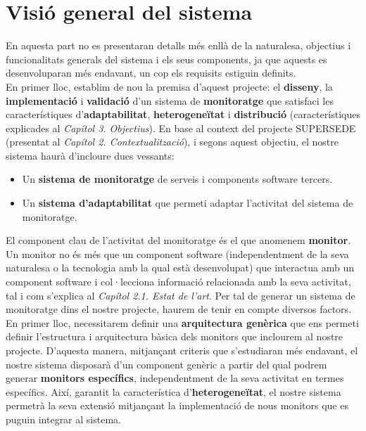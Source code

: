 
\chapter{Visió general del sistema} %

\label{AnalisiRequisits} %

En aquesta part no es presentaran detalls més enllà de la naturalesa, objectius i funcionalitats generals del sistema i els seus components, ja que aquests es desenvoluparan més endavant, un cop els requisits estiguin definits.\\

En primer lloc, establim de nou la premisa d'aquest projecte: el \textbf{disseny}, la \textbf{implementació} i \textbf{validació} d'un sistema de \textbf{monitoratge} que satisfaci les característiques d'\textbf{adaptabilitat}, \textbf{heterogeneïtat} i \textbf{distribució} (característiques explicades al \textit{Capítol 3. Objectius}). En base al context del projecte SUPERSEDE (presentat al \textit{Capítol 2. Contextualització}), i segons aquest objectiu, el nostre sistema haurà d'incloure dues vessants:

\begin{itemize}
\item Un \textbf{sistema de monitoratge} de serveis i components software tercers.
\item Un \textbf{sistema d'adaptabilitat} que permeti adaptar l'activitat del sistema de monitoratge.
\end{itemize}

El component clau de l'activitat del monitoratge és el que anomenem \textbf{monitor}. Un monitor no és més que un component software (independentment de la seva naturalesa o la tecnologia amb la qual està desenvolupat) que interactua amb un component software i col·lecciona informació relacionada amb la seva activitat, tal i com s'explica al \textit{Capítol 2.1. Estat de l'art}. Per tal de generar un sistema de monitoratge dins el nostre projecte, haurem de tenir en compte diversos factors.\\

En primer lloc, necessitarem definir una \textbf{arquitectura genèrica} que ens permeti definir l'estructura i arquitectura bàsica dels monitors que inclourem al nostre projecte. D'aquesta manera, mitjançant criteris que s'estudiaran més endavant, el nostre sistema disposarà d'un component genèric a partir del qual podrem generar \textbf{monitors específics}, independentment de la seva activitat en termes específics. Així, garantit la característica d'\textbf{heterogeneïtat}, el nostre sistema permetrà la seva extensió mitjançant la implementació de nous monitors que es puguin integrar al sistema.\\

